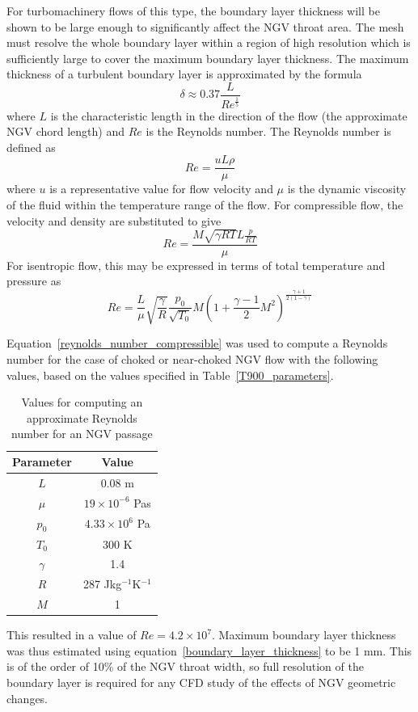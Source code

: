 \documentclass[a4paper, 11pt, oneside]{report}
\begin{document}
For turbomachinery flows of this type, the boundary layer thickness will be shown to be large enough to significantly affect the NGV throat area. The mesh must resolve the whole boundary layer within a region of high resolution which is sufficiently large to cover the maximum boundary layer thickness. The maximum thickness of a turbulent boundary layer is approximated by the formula
\begin{equation}\label{boundary_layer_thickness}
\delta \approx
0.37
\frac{L}{Re^\frac{1}{5}}
\end{equation}
where $L$ is the characteristic length in the direction of the flow (the approximate NGV chord length) and $Re$ is the Reynolds number. The Reynolds number is defined as
\begin{equation}
Re = 
\frac{uL\rho}{\mu}
\end{equation}
where $u$ is a representative value for flow velocity and $\mu$ is the dynamic viscosity of the fluid within the temperature range of the flow. For compressible flow, the velocity and density are substituted to give
\begin{equation}
Re = 
\frac{
	M\sqrt{\gamma RT}L\frac{p}{RT}
}{
	\mu
}
\end{equation}
For isentropic flow, this may be expressed in terms of total temperature and pressure as
\begin{equation}\label{reynolds_number_compressible}
Re = 
\frac{L}{\mu}
\sqrt{\frac{\gamma}{R}}
\frac{p_0}{\sqrt{T_0}}
M
\left(
	1 +
	\frac{\gamma-1}{2}
	M^2
\right)
^{\frac{\gamma+1}{2(1-\gamma)}}
\end{equation}

Equation~\ref{reynolds_number_compressible} was used to compute a Reynolds number for the case of choked or near-choked NGV flow with the following values, based on the values specified in Table~\ref{T900_parameters}.
\begin{table}[H]
\caption{Values for computing an approximate Reynolds number for an NGV passage}
\label{reynolds_number_parameters}
\begin{center}
\begin{tabular}{|c|c|}
\hline
Parameter & Value\\
\hline
$L$ & 0.08 m\\
$\mu$ & $19 \times 10^{-6}$ Pas\\
$p_0$ & $4.33 \times 10^6$ Pa\\
$T_0$ & 300 K\\
$\gamma$ & 1.4\\
$R$ & 287 Jkg$^{-1}$K$^{-1}$\\
$M$ & 1\\
\hline
\end{tabular}
\end{center}
\end{table}
This resulted in a value of $Re = 4.2 \times 10^7$. Maximum boundary layer thickness was thus estimated using equation~\ref{boundary_layer_thickness} to be 1 mm. This is of the order of 10\% of the NGV throat width, so full resolution of the boundary layer is required for any CFD study of the effects of NGV geometric changes.
\end{document}
